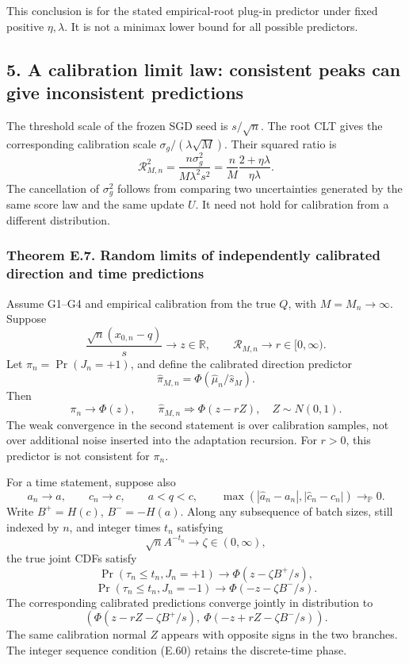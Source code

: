 This conclusion is for the stated empirical-root plug-in predictor under
fixed positive \(\eta,\lambda\). It is not a minimax lower bound for all
possible predictors.

\subsection{5. A calibration limit law: consistent peaks can give
inconsistent
predictions}\label{calibration-a-calibration-limit-law-consistent-peaks-can-give-inconsistent-predictions}

The threshold scale of the frozen SGD seed is \(s/\sqrt n\). The root
CLT gives the corresponding calibration scale
\(\sigma_g/(\lambda\sqrt M)\). Their squared ratio is \[
\mathcal R_{M,n}^2
=\frac{n\sigma_g^2}{M\lambda^2s^2}
=\frac nM\frac{2+\eta\lambda}{\eta\lambda}.
\tag{E.55}
\] The cancellation of \(\sigma_g^2\) follows from comparing two
uncertainties generated by the same score law and the same update \(U\).
It need not hold for calibration from a different distribution.

\subsubsection{Theorem E.7. Random limits of independently calibrated
direction and time
predictions}\label{calibration-theorem-e.7.-random-limits-of-independently-calibrated-direction-and-time-predictions}

Assume G1--G4 and empirical calibration from the true \(Q\), with
\(M=M_n\to\infty\). Suppose \[
\frac{\sqrt n(x_{0,n}-q)}s\to z\in\mathbb R,\qquad
\mathcal R_{M,n}\to r\in[0,\infty).
\tag{E.56}
\] Let \(\pi_n=\Pr(J_n=+1)\), and define the calibrated direction
predictor \[
\widehat\pi_{M,n}=\Phi(\widehat\mu_n/\widehat s_M).
\tag{E.57}
\] Then \[
\pi_n\to\Phi(z),\qquad
\widehat\pi_{M,n}\Rightarrow\Phi(z-rZ),
\quad Z\sim N(0,1).
\tag{E.58}
\] The weak convergence in the second statement is over calibration
samples, not over additional noise inserted into the adaptation
recursion. For \(r>0\), this predictor is not consistent for \(\pi_n\).

For a time statement, suppose also \[
a_n\to a,\qquad c_n\to c,\qquad a<q<c,\qquad
\max(|\widehat a_n-a_n|,|\widehat c_n-c_n|)
\to_{\mathbb P}0.
\tag{E.59}
\] Write \(B^+=H(c)\), \(B^-=-H(a)\). Along any subsequence of batch
sizes, still indexed by \(n\), and integer times \(t_n\) satisfying \[
\sqrt n A^{-t_n}\to\zeta\in(0,\infty),
\tag{E.60}
\] the true joint CDFs satisfy \[
\Pr(\tau_n\le t_n,J_n=+1)\to\Phi(z-\zeta B^+/s),
\] \[
\Pr(\tau_n\le t_n,J_n=-1)\to\Phi(-z-\zeta B^-/s).
\tag{E.61}
\] The corresponding calibrated predictions converge jointly in
distribution to \[
\left(
\Phi(z-rZ-\zeta B^+/s),
\ \Phi(-z+rZ-\zeta B^-/s)
\right).
\tag{E.62}
\] The same calibration normal \(Z\) appears with opposite signs in the
two branches. The integer sequence condition (E.60) retains the
discrete-time phase.

